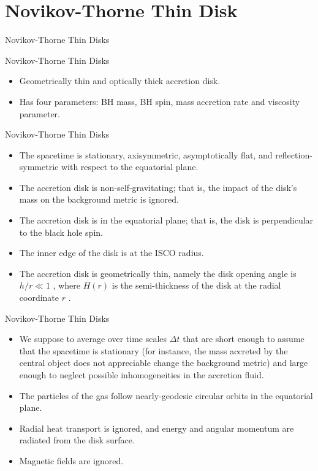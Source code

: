 \documentclass{beamer}
\begin{document}
\section{Novikov-Thorne Thin Disk}    
\begin{darkframes}

\begin{frame}
\Huge
Novikov-Thorne Thin Disks
\end{frame}

\begin{frame}{Novikov-Thorne Thin Disks}
	\begin{itemize}
	\item Geometrically thin and optically thick accretion disk.
	\pause
	\item Has four parameters: BH mass, BH spin, mass accretion rate and viscosity parameter.
	\end{itemize}		
\end{frame}

\begin{frame}{Novikov-Thorne Thin Disks}
	\begin{itemize}
	\item The spacetime is stationary, axisymmetric, asymptotically flat, and reflection- symmetric with respect to the equatorial plane.
	\pause
	\item The accretion disk is non-self-gravitating; that is, the impact of the disk’s mass on the background metric is ignored.
	\pause
	\item The accretion disk is in the equatorial plane; that is, the disk is perpendicular to the black hole spin.
	\pause
	\item The inner edge of the disk is at the ISCO radius.
	\pause
	\item The accretion disk is geometrically thin, namely the disk opening angle is $h/r\ll
1$ , where $H(r)$ is the semi-thickness of the disk at the radial coordinate $r$ .
	\end{itemize}		
\end{frame}

\begin{frame}{Novikov-Thorne Thin Disks}
	\begin{itemize}
	\item We suppose to average over time scales $\Delta t$ that are short enough to assume that the spacetime is stationary (for instance, the mass accreted by the central object does not appreciable change the background metric) and large enough to neglect possible inhomogeneities in the accretion fluid.
	\pause
	\item The particles of the gas follow nearly-geodesic circular orbits in the equatorial
plane.
	\pause
	\item Radial heat transport is ignored, and energy and angular momentum are radiated from the disk surface.
	\pause
	\item Magnetic fields are ignored.
	\end{itemize}		
\end{frame}


\end{darkframes}
\end{document}
